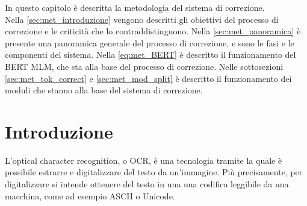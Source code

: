 In questo capitolo è descritta la metodologia del sistema di correzione.\\
Nella \autoref{sec:met_introduzione} vengono descritti gli obiettivi del processo di correzione e le criticità che lo contraddistinguono.
Nella \autoref{sec:met_panoramica} è presente una panoramica generale del processo di correzione, e sono le fasi e le componenti del sistema. Nella \autoref{eq:met_BERT} è descritto il funzionamento del BERT MLM, che sta alla base del processo di correzione. Nelle sottosezioni \ref{sec:met_tok_correct} e \ref{sec:met_mod_split} è descritto il funzionamento dei moduli che stanno alla base del sistema di correzione.


\section{Introduzione}
\label{sec:met_introduzione}
L'optical character recognition, o OCR, è una tecnologia tramite la quale è possibile estrarre e digitalizzare del testo da un'immagine. Più precisamente, per digitalizzare si intende ottenere del testo in una una codifica leggibile da una macchina, come ad esempio ASCII o Unicode.

